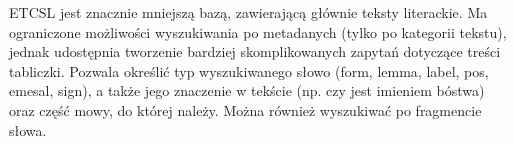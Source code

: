 ETCSL jest znacznie mniejszą bazą, zawierającą głównie teksty literackie. 
Ma ograniczone możliwości wyszukiwania po metadanych (tylko po kategorii tekstu), jednak udostępnia tworzenie bardziej 
skomplikowanych zapytań dotyczące treści tabliczki. 
Pozwala określić typ wyszukiwanego słowo (form, lemma, label, pos, emesal, sign),
 a także jego znaczenie w tekście (np. czy jest imieniem bóstwa) oraz część mowy, do której należy. 
Można również wyszukiwać po fragmencie słowa.
